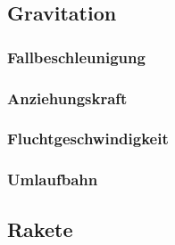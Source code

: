 
\subsection{Gravitation}
\todo{}

\subsubsection{Fallbeschleunigung}
\todo{}

\subsubsection{Anziehungskraft}
\todo{}

\subsubsection{Fluchtgeschwindigkeit}
\todo{}

\subsubsection{Umlaufbahn}
\todo{}

\subsection{Rakete}
\todo{}
